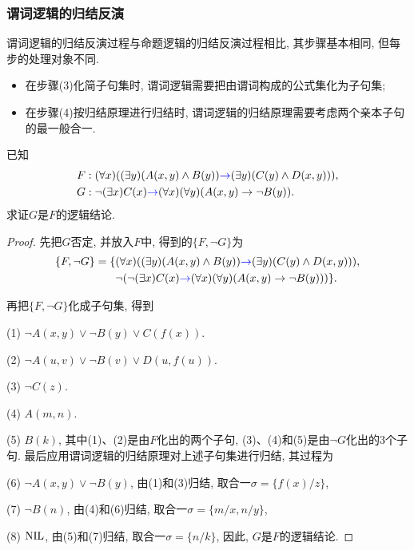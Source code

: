 \subsubsection{谓词逻辑的归结反演}
谓词逻辑的归结反演过程与命题逻辑的归结反演过程相比, 其步骤基本相同, 但每步的处理对象不同.
\begin{itemize}
    \item 在步骤(3)化简子句集时, 谓词逻辑需要把由谓词构成的公式集化为子句集;
    \item 在步骤(4)按归结原理进行归结时, 谓词逻辑的归结原理需要考虑两个亲本子句的最一般合一.
\end{itemize}
\begin{example}
已知
\begin{align}
 &F:  (\forall x)((\exists  y)(A(x, y)\wedge B(y))\textcolor[rgb]{0,0,1}{\rightarrow} (\exists  y)(C(y)\wedge D(x, y))),\\
 &G: \neg (\exists  x)C(x)\textcolor[rgb]{0,0,1}{\rightarrow} (\forall x)(\forall y)(A(x, y)\rightarrow \neg B(y)).
\end{align}
求证$G$是$F$的逻辑结论.
\end{example}
\begin{proof}
    先把$G$否定, 并放入$F$中, 得到的$\{F, \neg G\}$为
\begin{align}
  \{F, \neg G\}=\{
    &(\forall x)((\exists y)(A(x,y)\wedge B(y))\textcolor[rgb]{0,0,1}{\rightarrow} (\exists y)(C(y)\wedge D(x,y))),\notag\\
    &\neg (\neg (\exists x)C(x)\textcolor[rgb]{0,0,1}{\rightarrow} (\forall  x)(\forall y)(A(x,y)\rightarrow \neg B(y)))\}.
\end{align}

再把$\{F,\neg G\}$化成子句集, 得到

     (1) $\neg A(x,y)\vee \neg B(y) \vee C(f(x))$.

     (2) $\neg A(u,v)\vee \neg B(v) \vee D(u,f(u))$.

     (3) $\neg C(z)$.

     (4) $A(m,n)$.

     (5) $B(k)$, 其中(1)、(2)是由$F$化出的两个子句, (3)、(4)和(5)是由$\neg G$化出的3个子句.
     最后应用谓词逻辑的归结原理对上述子句集进行归结, 其过程为

     (6) $\neg  A(x,y)\vee  \neg  B(y)$, 由(1)和(3)归结, 取合一$\sigma=\{f(x)/z\}$,

     (7) $\neg  B(n)$, 由(4)和(6)归结, 取合一$\sigma =\{m/x,n/y\}$,

     (8) $\textup{NIL}$, 由(5)和(7)归结, 取合一$\sigma=\{n/k\}$, 因此, $G$是$F$的逻辑结论.
\end{proof}
